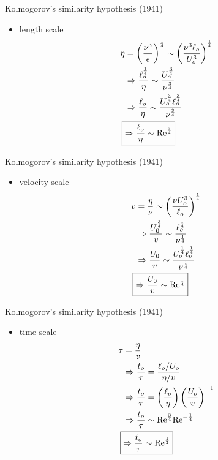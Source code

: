 \begin{frame}{Kolmogorov's similarity hypothesis (1941)}
\begin{itemize}
	\item length scale
	\begin{align*} 
		\eta &= \left(\frac{\nu^3}{\epsilon}\right)^{\frac{1}{4}} \sim \left(\frac{\nu^3 \ell_o}{U_o^3}\right)^{\frac{1}{4}}\\ 
		&\Rightarrow \frac{\ell_o^{\frac{1}{4}}}{\eta} \sim \frac{U_o^{\frac{3}{4}}}{\nu^{\frac{3}{4}}}\\
		&\Rightarrow \frac{\ell_o}{\eta} \sim \frac{U_o^{\frac{3}{4}}\ell_o^{\frac{3}{4}}}{\nu^{\frac{3}{4}}} \\
		\Aboxed{&\Rightarrow \frac{\ell_o}{\eta} \sim \text{Re}^{\frac{3}{4}}}
	\end{align*}
\end{itemize}
\end{frame}


\begin{frame}{Kolmogorov's similarity hypothesis (1941)}
\begin{itemize}
	\item velocity scale
	\begin{align*} 
		v &= \frac{\eta}{\nu} \sim \left( \frac{\nu U_o^3}{\ell_o}\right)^{\frac{1}{4}}\\
		&\Rightarrow \frac{U_0^{\frac{3}{4}}}{v} \sim \frac{\ell_o^{\frac{1}{4}}}{\nu^{\frac{1}{4}}}\\
		&\Rightarrow \frac{U_0}{v} \sim \frac{U_o^{\frac{1}{4}}\ell_o^{\frac{1}{4}}}{\nu^{\frac{1}{4}}}\\
		\Aboxed{ &\Rightarrow \frac{U_0}{v} \sim \text{Re}^{\frac{1}{4}}}
	\end{align*}
\end{itemize}
\end{frame}


\begin{frame}{Kolmogorov's similarity hypothesis (1941)}
\begin{itemize}
	\item time scale
	\begin{align*} 
		\tau &= \frac{\eta}{v}\\
		&\Rightarrow \frac{t_o}{\tau} = \frac{\ell_o/U_o}{\eta/v}\\
		&\Rightarrow \frac{t_o}{\tau} = \left(\frac{\ell_o}{\eta}\right) \left(\frac{U_o}{v}\right)^{-1}\\
		&\Rightarrow \frac{t_o}{\tau} \sim \text{Re}^{\frac{3}{4}} \text{Re}^{-\frac{1}{4}}\\
		\Aboxed{&\Rightarrow \frac{t_o}{\tau} \sim \text{Re}^{\frac{1}{2}}}
	\end{align*}
\end{itemize}
\end{frame}

